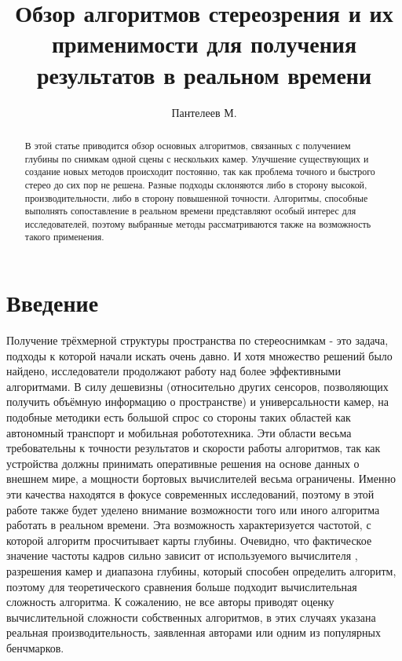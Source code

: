 

\raggedbottom
%


\title{Обзор алгоритмов стереозрения и их применимости для получения результатов в реальном времени}
\author{Пантелеев М.}
\maketitle

\begin{abstract}
	В этой статье приводится обзор основных алгоритмов, связанных с получением глубины по снимкам одной сцены с нескольких камер. Улучшение существующих и
	создание новых методов происходит постоянно, так как проблема точного и быстрого стерео до сих пор не решена. Разные подходы склоняются либо в сторону высокой, 
	производительности, либо в сторону повышенной точности. Алгоритмы, способные выполнять сопоставление в реальном времени представляют особый интерес для 
	исследователей, поэтому выбранные методы рассматриваются также на возможность такого применения.

\end{abstract}

\section{Введение}
Получение трёхмерной структуры пространства по стереоснимкам - это задача, подходы к которой начали искать очень давно. И хотя 
множество решений было найдено, исследователи продолжают работу над более эффективными алгоритмами. В силу дешевизны (относительно других сенсоров,
позволяющих получить объёмную информацию о пространстве) и универсальности камер, на подобные методики есть большой спрос со стороны 
таких областей как автономный транспорт и мобильная робототехника. 					%
Эти области весьма требовательны к точности результатов и скорости работы алгоритмов, так как устройства должны принимать оперативные решения на основе 
данных о внешнем мире, а мощности бортовых вычислителей весьма ограничены. Именно эти качества находятся в фокусе современных исследований, поэтому в этой 
работе также будет уделено внимание возможности того или иного алгоритма работать в реальном времени. Эта возможность характеризуется частотой, с которой 
алгоритм просчитывает карты глубины. Очевидно, что фактическое значение частоты кадров сильно зависит от используемого вычислителя \cite{archs}, разрешения камер и диапазона 
глубины, который способен определить алгоритм, поэтому для теоретического сравнения больше подходит вычислительная сложность алгоритма. К сожалению, не 
все авторы приводят оценку вычислительной сложности собственных алгоритмов, в этих случаях указана реальная производительность, заявленная авторами или 
одним из популярных бенчмарков. 

